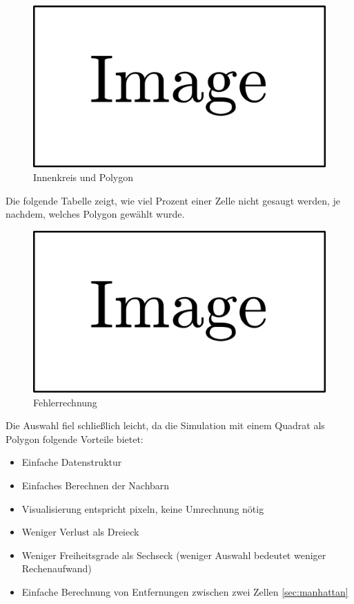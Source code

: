 \documentclass{article}
\begin{document}
\begin{figure}
\includegraphics{img/dummy.png}
\caption{Innenkreis und Polygon}
\label{img:floor_quotient_circle_polygon}
\end{figure}

Die folgende Tabelle zeigt, wie viel Prozent einer Zelle nicht gesaugt werden,
je nachdem, welches Polygon gewählt wurde.

\begin{figure}
\includegraphics{img/dummy.png}
\caption{Fehlerrechnung}
\label{img:floor_error_circle_polygon}
\end{figure}

Die Auswahl fiel schließlich leicht, da die Simulation mit einem Quadrat als Polygon
folgende Vorteile bietet:

\begin{itemize}
\item Einfache Datenstruktur
\item Einfaches Berechnen der Nachbarn
\item Visualisierung entspricht pixeln, keine Umrechnung nötig
\item Weniger Verlust als Dreieck
\item Weniger Freiheitsgrade als Sechseck (weniger Auswahl bedeutet weniger Rechenaufwand)
\item Einfache Berechnung von Entfernungen zwischen zwei Zellen \ref{sec:manhattan}
\end{itemize}
\end{document}
